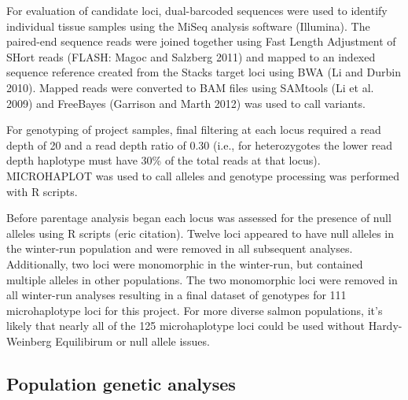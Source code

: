 For evaluation of candidate loci, dual-barcoded sequences were used to identify individual tissue samples using the MiSeq analysis software (Illumina). The paired-end sequence reads were joined together using Fast Length Adjustment of SHort reads (FLASH: Magoc and Salzberg 2011) and mapped to an indexed sequence reference created from the Stacks target loci using BWA (Li and Durbin 2010). Mapped reads were converted to BAM files using SAMtools (Li et al. 2009) and FreeBayes (Garrison and Marth 2012) was used to call variants.

For genotyping of project samples, final filtering at each locus required a read depth of 20 and a read depth ratio of 0.30 (i.e., for heterozygotes the lower read depth haplotype must have 30\% of the total reads at that locus). MICROHAPLOT was used to call alleles and genotype processing was performed with R scripts. 

Before parentage analysis began each locus was assessed for the presence of null alleles using R scripts (eric citation). Twelve loci appeared to have null alleles in the winter-run population and were removed in all subsequent analyses. Additionally, two loci were monomorphic in the winter-run, but contained multiple alleles in other populations. The two monomorphic loci were removed in all winter-run analyses resulting in a final dataset of genotypes for 111 microhaplotype loci for this project. For more diverse salmon populations, it's likely that nearly all of the 125 microhaplotype loci could be used without Hardy-Weinberg Equilibirum or null allele issues.


\subsection*{Population genetic analyses}

